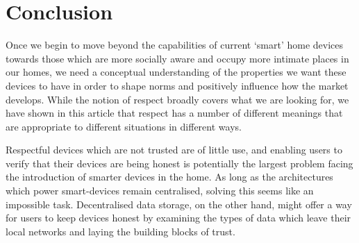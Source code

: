 \documentclass{IETpaper}
\begin{document}





\section{Conclusion}

Once we begin to move beyond the capabilities of current ‘smart’ home devices towards those which are more socially aware and occupy more intimate places in our homes, we need a conceptual understanding of the properties we want these devices to have in order to shape norms and positively influence how the market develops. While the notion of respect broadly covers what we are looking for, we have shown in this article that respect has a number of different meanings that are appropriate to different situations in different ways.

Respectful devices which are not trusted are of little use, and enabling users to verify that their devices are being honest is potentially the largest problem facing the introduction of smarter devices in the home. As long as the architectures which power smart-devices remain centralised, solving this seems like an impossible task. Decentralised data storage, on the other hand, might offer a way for users to keep devices honest by examining the types of data which leave their local networks and laying the building blocks of trust.
\end{document}
